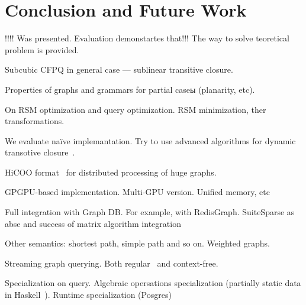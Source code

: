 \section{Conclusion and Future Work}

!!!! Was presented.
Evaluation demonstartes that!!!
The way to solve teoretical problem is provided.

Subcubic CFPQ in general case --- sublinear transitive closure.

Properties of graphs and grammars for partial caseы (planarity, etc).

On RSM optimization and query optimization. RSM minimization, ther transformations.

We evaluate na{\"i}ve implemantation. Try to use advanced algorithms for dynamic transotive closure~\cite{cs6345}.

HiCOO format~\cite{!!!} for distributed processing of huge graphs.

GPGPU-based implementation. Multi-GPU version. Unified memory, etc~\cite{!!!}

Full integration with Graph DB.
For example, with RedisGraph.
SuiteSparse as abse and success of matrix algorithm integration~\cite{!!!}

Other semantics: shortest path, simple path and so on. 
Weighted graphs.

Streaming graph querying.
Both regular~\cite{Pacaci2020RegularPQ} and context-free.

Specialization on query.
Algebraic opersations specialization (partially static data in Haskell~\cite{!!!}).
Runtime specialization (Posgres)~\cite{!!!}
